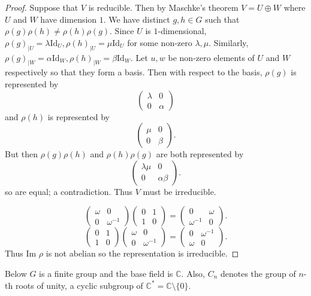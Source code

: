 \documentclass{article}
\begin{document}
\begin{proof}
Suppose that $V$ is reducible. Then by Maschke's theorem $V=U\oplus W$ where $U$ and $W$ have dimension $1$. We have distinct $g,h\in G$ such that $\rho(g)\rho(h)\neq\rho(h)\rho(g)$. Since $U$ is $1$-dimensional, $\rho(g)_{|U}=\lambda\text{Id}_U,\rho(h)_{|U}=\mu\text{Id}_U$ for some non-zero $\lambda,\mu$. Similarly, $\rho(g)_{|W}=\alpha\text{Id}_W,\rho(h)_{|W}=\beta\text{Id}_W$. Let $u,w$ be non-zero elements of $U$ and $W$ respectively so that they form a basis. Then with respect to the basis, $\rho(g)$ is represented by \[\begin{pmatrix}
\lambda & 0 \\
0 & \alpha
\end{pmatrix}\] and $\rho(h)$ is represented by\[\begin{pmatrix}
\mu & 0 \\
0 & \beta
\end{pmatrix}.\] But then $\rho(g)\rho(h)$ and $\rho(h)\rho(g)$ are both represented by \[\begin{pmatrix}
\lambda\mu & 0 \\
0 & \alpha\beta
\end{pmatrix}.\] so are equal; a contradiction. Thus $V$ must be irreducible.


\[\begin{pmatrix}
\omega & 0 \\
0 & \omega^{-1}
\end{pmatrix}\begin{pmatrix}
0 & 1 \\
1 & 0
\end{pmatrix}=
\begin{pmatrix}
0 & \omega \\
\omega^{-1} & 0
\end{pmatrix}.\]
\[
\begin{pmatrix}
0 & 1 \\
1 & 0
\end{pmatrix}\begin{pmatrix}
\omega & 0 \\
0 & \omega^{-1}
\end{pmatrix}=
\begin{pmatrix}
0 & \omega^{-1} \\
\omega & 0
\end{pmatrix}.
\]
Thus $\text{Im }\rho$ is not abelian so the representation is irreducible.
\end{proof}


Below \( G \) is a finite group and the base field is \( \mathbb{C} \).  
Also, \( C_n \) denotes the group of \( n \)-th roots of unity, a cyclic subgroup of \( \mathbb{C}^* = \mathbb{C} \setminus \{ 0 \} \).
\end{document}
